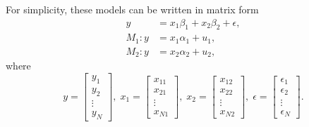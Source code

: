 \documentclass{monashthesis}
\begin{document}
For simplicity, these models can be written in matrix form
\begin{align*}
y &= x_1 \beta_{1} + x_2 \beta_{2} + \epsilon, \\
M_1 : y &= x_1 \alpha_{1} + u_1, \\
M_2 : y &= x_2 \alpha_{2} + u_2,
\end{align*}
where
\[
     {y}=\begin{bmatrix}
           y_{1} \\
           y_{2} \\
           \vdots \\
           y_{N}
         \end{bmatrix},\;
     {x_1}=\begin{bmatrix}
           x_{11} \\
           x_{21} \\
           \vdots \\
           x_{N1}
         \end{bmatrix},\;
    {x_2}=\begin{bmatrix}
           x_{12} \\
           x_{22} \\
           \vdots \\
           x_{N2}
         \end{bmatrix},\;
    {\epsilon}=\begin{bmatrix}
           \epsilon_{1} \\
           \epsilon_{2} \\
           \vdots \\
           \epsilon_{N}
         \end{bmatrix}.
\]
\end{document}
